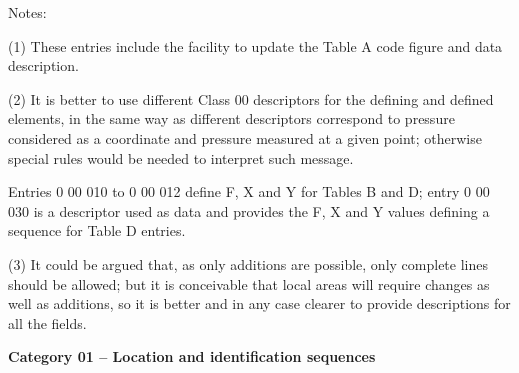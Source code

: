 Notes:

(1) These entries include the facility to update the Table A code figure and data description.

(2) It is better to use different Class 00 descriptors for the defining and defined elements, in the same way as different descriptors correspond to pressure considered as a coordinate and pressure measured at a given point; otherwise special rules would be needed to interpret such message.

Entries 0 00 010 to 0 00 012 define F, X and Y for Tables B and D; entry 0 00 030 is a descriptor used as data and provides the F, X and Y values defining a sequence for Table D entries.

(3) It could be argued that, as only additions are possible, only complete lines should be allowed; but it is conceivable that local areas will require changes as well as additions, so it is better and in any case clearer to provide descriptions for all the fields.

\textbf{Category 01 -- Location and identification sequences}

